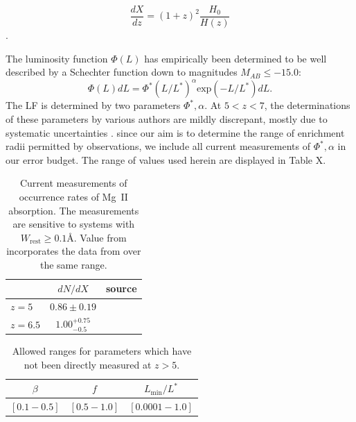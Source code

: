 \documentclass[useAMS,usenatbib]{mn2e}
\newcommand{\magtwo}{Mg~{\small II} }
\begin{document}
\begin{equation}
\frac{dX}{dz} = \left(1+z\right)^2 \frac{H_0}{H(z)}
\end{equation}.

The luminosity function $\Phi(L)$ has empirically been determined to be well described by a Schechter function down to magnitudes $M_{AB}\leq-15.0$:
\begin{equation} 
\Phi(L) dL = \Phi^* (L/L^*)^\alpha \text{exp} (-L/L^*) dL.
\end{equation}
The LF is determined by two parameters ${\Phi^*,\alpha}$. At $5<z<7$, the determinations of these parameters by various authors are mildly discrepant, mostly due to systematic uncertainties \citep{Bouwens16}. since our aim is to determine the range of enrichment radii permitted by observations, we include all current measurements of ${\Phi^*,\alpha}$ in our error budget. The range of values used herein are displayed in Table X.

\begin{table}
\centering
\begin{tabular}{l c c}
 &$dN/dX$ & source \\
\hline
$z=5$ & $0.86\pm0.19$&\citet{Codoreanu17} \\
\hline
$z=6.5$&$1.00_{-0.5}^{+0.75}$&\citet{Bosman17}\\
\hline
\end{tabular}
\caption{Current measurements of occurrence rates of \magtwo absorption. The measurements are sensitive to systems with $W_\text{rest}\geq 0.1$\AA. Value from \citet{Bosman17} incorporates the data from \citet{Chen16} over the same range.}
\end{table}

\begin{table}
\centering
\begin{tabular}{c c c}
$\beta$&$f$&$L_\text{min}/L^*$ \\
\hline
$[0.1 - 0.5]$&$[0.5 - 1.0]$&$[0.0001 - 1.0]$\\
\end{tabular}
\caption{Allowed ranges for parameters which have not been directly measured at $z>5$.}
\end{table}
\end{document}
